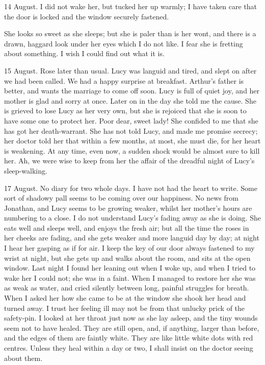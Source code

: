 \begin{diary}{14 August.}
I did not wake her, but tucked her up warmly; I have taken care that the door is locked and the window securely fastened.

She looks so sweet as she sleeps; but she is paler than is her wont, and there is a drawn, haggard look under her eyes which I do not like. I fear she is fretting about something. I wish I could find out what it is.

 \end{diary}

\begin{diary}{15 August.}
Rose later than usual. Lucy was languid and tired, and slept on after we had been called. We had a happy surprise at breakfast. Arthur's father is better, and wants the marriage to come off soon. Lucy is full of quiet joy, and her mother is glad and sorry at once. Later on in the day she told me the cause. She is grieved to lose Lucy as her very own, but she is rejoiced that she is soon to have some one to protect her. Poor dear, sweet lady! She confided to me that she has got her death-warrant. She has not told Lucy, and made me promise secrecy; her doctor told her that within a few months, at most, she must die, for her heart is weakening. At any time, even now, a sudden shock would be almost sure to kill her. Ah, we were wise to keep from her the affair of the dreadful night of Lucy's sleep-walking.
\end{diary}
 

\begin{diary}{17 August.}
No diary for two whole days. I have not had the heart to write. Some sort of shadowy pall seems to be coming over our happiness. No news from Jonathan, and Lucy seems to be growing weaker, whilst her mother's hours are numbering to a close. I do not understand Lucy's fading away as she is doing. She eats well and sleeps well, and enjoys the fresh air; but all the time the roses in her cheeks are fading, and she gets weaker and more languid day by day; at night I hear her gasping as if for air. I keep the key of our door always fastened to my wrist at night, but she gets up and walks about the room, and sits at the open window. Last night I found her leaning out when I woke up, and when I tried to wake her I could not; she was in a faint. When I managed to restore her she was as weak as water, and cried silently between long, painful struggles for breath. When I asked her how she came to be at the window she shook her head and turned away. I trust her feeling ill may not be from that unlucky prick of the safety-pin. I looked at her throat just now as she lay asleep, and the tiny wounds seem not to have healed. They are still open, and, if anything, larger than before, and the edges of them are faintly white. They are like little white dots with red centres. Unless they heal within a day or two, I shall insist on the doctor seeing about them.
	\end{diary}
	
